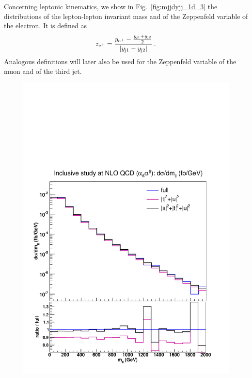 Concerning leptonic kinematics, we show in Fig.~\ref{fig:mjjdyjj_1d_3} the distributions of the lepton-lepton invariant mass and of the Zeppenfeld variable of the electron. 
It is defined as
\begin{equation}
  z_{\text{e}^+} = \frac{y_{\text{e}^+}-\frac{y_{\text{j}1}+y_{\text{j}2}}2}{|y_{\text{j}1}-y_{\text{j}2}|} \,.
  \label{eq:Zeppenfeld}
\end{equation}
Analogous definitions will later also be used for the Zeppenfeld variable of the muon and of the third jet.
\begin{figure}[hbt]
\centering
{\includegraphics[scale=0.35]{figures/scanfigures/mll_nlo.pdf}}

\end{figure}
